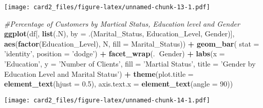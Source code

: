 \documentclass[]{article}
\newenvironment{Shaded}{\begin{snugshade}}{\end{snugshade}}
\newcommand{\CommentTok}[1]{\textcolor[rgb]{0.56,0.35,0.01}{\textit{#1}}}
\newcommand{\DataTypeTok}[1]{\textcolor[rgb]{0.13,0.29,0.53}{#1}}
\newcommand{\DecValTok}[1]{\textcolor[rgb]{0.00,0.00,0.81}{#1}}
\newcommand{\FloatTok}[1]{\textcolor[rgb]{0.00,0.00,0.81}{#1}}
\newcommand{\KeywordTok}[1]{\textcolor[rgb]{0.13,0.29,0.53}{\textbf{#1}}}
\newcommand{\NormalTok}[1]{#1}
\newcommand{\OperatorTok}[1]{\textcolor[rgb]{0.81,0.36,0.00}{\textbf{#1}}}
\newcommand{\StringTok}[1]{\textcolor[rgb]{0.31,0.60,0.02}{#1}}
\begin{document}
\texttt{[image: card2\_files/figure-latex/unnamed-chunk-13-1.pdf]}

\begin{Shaded}
\begin{Highlighting}[]
\CommentTok{#Percentage of Customers by Martical Status, Education level and Gender}
\KeywordTok{ggplot}\NormalTok{(df[, }\KeywordTok{list}\NormalTok{(.N), }\DataTypeTok{by =}\NormalTok{ .(Marital_Status, Education_Level, Gender)], }\KeywordTok{aes}\NormalTok{(}\KeywordTok{factor}\NormalTok{(Education_Level), N, }\DataTypeTok{fill =}\NormalTok{ Marital_Status)) }\OperatorTok{+}\StringTok{ }\KeywordTok{geom_bar}\NormalTok{( }\DataTypeTok{stat =} \StringTok{'identity'}\NormalTok{, }\DataTypeTok{position =} \StringTok{'dodge'}\NormalTok{) }\OperatorTok{+}
\StringTok{  }\KeywordTok{facet_wrap}\NormalTok{(.}\OperatorTok{~}\NormalTok{Gender) }\OperatorTok{+}\StringTok{ }\KeywordTok{labs}\NormalTok{(}\DataTypeTok{x =} \StringTok{'Education'}\NormalTok{, }\DataTypeTok{y =} \StringTok{'Number of Clients'}\NormalTok{, }\DataTypeTok{fill =} \StringTok{'Martial Status'}\NormalTok{,}
                              \DataTypeTok{title =} \StringTok{'Gender by Education Level and Marital Status'}\NormalTok{) }\OperatorTok{+}
\StringTok{  }\KeywordTok{theme}\NormalTok{(}\DataTypeTok{plot.title =} \KeywordTok{element_text}\NormalTok{(}\DataTypeTok{hjust =} \FloatTok{0.5}\NormalTok{), }\DataTypeTok{axis.text.x =} \KeywordTok{element_text}\NormalTok{(}\DataTypeTok{angle =} \DecValTok{90}\NormalTok{))}
\end{Highlighting}
\end{Shaded}

\texttt{[image: card2\_files/figure-latex/unnamed-chunk-14-1.pdf]}
\end{document}
